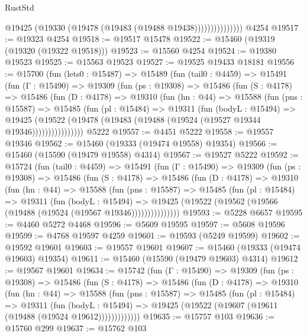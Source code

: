 \begin{lexlean}{RustStd}
\begin{coremodule}
                        @19425 (@19330 (@19478 (@19483 (@19488 @19438)))))))))))))))
    @4254
@19517 := @19323 @4254
@19518 := @19517 @15478
@19522 := @15460 (@19319 (@19320 (@19322 @19518)))
@19523 := @15560 @4254
@19524 := @19380 @19523
@19525 := @15563 @19523
@19527 := @19525 @19433 @18181
@19556 := @15700
    (fun (lets0 : @15487) =>
    @15489
      (fun (tail0 : @4459) =>
      @15491
        (fun (Γ : @15490) =>
        @19309
          (fun (ps : @19308) =>
          @15486
            (fun (S : @4178) =>
            @15486
              (fun (D : @4178) =>
              @19310
                (fun (hn : @44) =>
                @15588
                  (fun (pns : @15587) =>
                  @15485
                    (fun (pl : @15484) =>
                    @19311
                      (fun (bodyL : @15494) =>
                      @19425
                        (@19522
                          (@19478 (@19483 (@19488 (@19524 (@19527 @19344 @19346))))))))))))))))
    @5222
@19557 := @4451 @5222
@19558 := @19557 @19346
@19562 := @15460 (@19333 (@19474 @19558) @19354)
@19566 := @15460 (@15590 (@19479 @19558) @4314)
@19567 := @19527 @5222
@19592 := @15724
    (fun (tail0 : @4459) =>
    @15491
      (fun (Γ : @15490) =>
      @19309
        (fun (ps : @19308) =>
        @15486
          (fun (S : @4178) =>
          @15486
            (fun (D : @4178) =>
            @19310
              (fun (hn : @44) =>
              @15588
                (fun (pns : @15587) =>
                @15485
                  (fun (pl : @15484) =>
                  @19311
                    (fun (bodyL : @15494) =>
                    @19425 (@19522 (@19562 (@19566 (@19488 (@19524 (@19567 @19346)))))))))))))))
@19593 := @5228 @6657
@19595 := @4460 @5272 @4468
@19596 := @5609 @19595
@19597 := @5608 @19596
@19599 := @4768 @19597 @4259
@19601 := @19593 (@5249 @19599)
@19602 := @19592 @19601
@19603 := @19557 @19601
@19607 := @15460 (@19333 (@19474 @19603) @19354)
@19611 := @15460 (@15590 (@19479 @19603) @4314)
@19612 := @19567 @19601
@19634 := @15742
    (fun (Γ : @15490) =>
    @19309
      (fun (ps : @19308) =>
      @15486
        (fun (S : @4178) =>
        @15486
          (fun (D : @4178) =>
          @19310
            (fun (hn : @44) =>
            @15588
              (fun (pns : @15587) =>
              @15485
                (fun (pl : @15484) =>
                @19311
                  (fun (bodyL : @15494) =>
                  @19425 (@19522 (@19607 (@19611 (@19488 (@19524 @19612)))))))))))))
@19635 := @15757 @103
@19636 := @15760 @299
@19637 := @15762 @103

\end{coremodule}
\end{lexlean}
